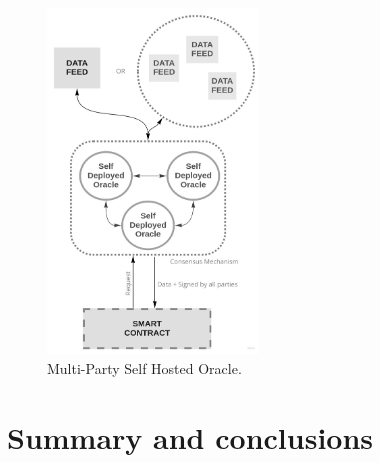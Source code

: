 \begin{figure}[t]
  \begin{center}
    \leavevmode
    \includegraphics[width=0.5\textwidth]{figures/oraclearch4.jpg}
    \caption{Multi-Party Self Hosted Oracle.}
    \label{fig:/figures/paper-screening}
  \end{center}
\end{figure}


\section{Summary and conclusions}
